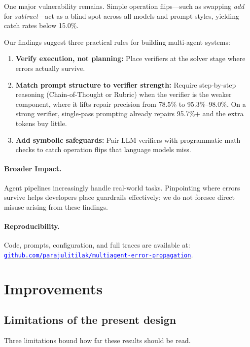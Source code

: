 \documentclass[11pt]{article}
\begin{document}
One major vulnerability remains. Simple operation flips---such as swapping \emph{add} for \emph{subtract}---act as a blind spot across all models and prompt styles, yielding catch rates below 15.0\%.

Our findings suggest three practical rules for building multi-agent systems:
\begin{enumerate}
    \item \textbf{Verify execution, not planning:} Place verifiers at the solver stage where errors actually survive.
    \item \textbf{Match prompt structure to verifier strength:} Require step-by-step reasoning (Chain-of-Thought or Rubric) when the verifier is the weaker component, where it lifts repair precision from 78.5\% to 95.3\%--98.0\%. On a strong verifier, single-pass prompting already repairs 95.7\%+ and the extra tokens buy little.
    \item \textbf{Add symbolic safeguards:} Pair LLM verifiers with programmatic math checks to catch operation flips that language models miss.
\end{enumerate}

\paragraph{Broader Impact.} Agent pipelines increasingly handle real-world tasks. Pinpointing where errors survive helps developers place guardrails effectively; we do not foresee direct misuse arising from these findings.

\paragraph{Reproducibility.} Code, prompts, configuration, and full traces are available at: \newline
\href{https://github.com/parajulitilak/multiagent-error-propagation}{\textcolor{blue}{\texttt{github.com/parajulitilak/multiagent-error-propagation}}}.

\section{Improvements}

\subsection*{Limitations of the present design}\label{sec:limitations}
Three limitations bound how far these results should be read.
\end{document}
